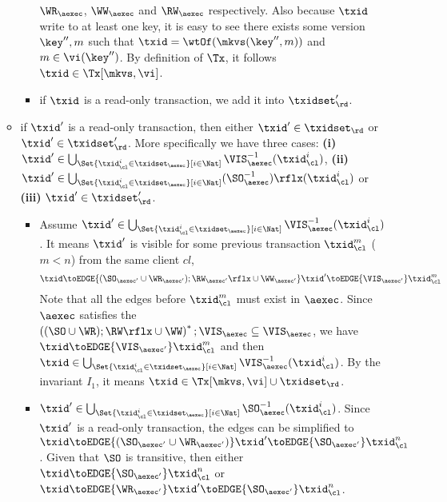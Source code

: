 \begin{itemize}
\begin{itemize}
\begin{itemize}
        \( \WR_\aexec \), \( \WW_\aexec \) and \( \RW_\aexec \) respectively.
        Also because \( \txid \) write to at least one key,
        it is easy to see there exists some version \( \key'',m\) such that 
        \( \txid = \wtOf(\mkvs(\key'',m))\) and \( m \in \vi(\key'')\).
        By definition of \( \Tx \), it follows \( \txid \in \Tx[\mkvs, \vi] \).
        \item if \( \txid \) is a read-only transaction, we add it into \( \txidset'_\rd \).
    \end{itemize}
    \item 
    if \( \txid' \) is a read-only transaction, then either \( \txid' \in \txidset_\rd \) or \( \txid' \in \txidset'_\rd \).
    More specifically we have three cases: \textbf{(i)} \( \txid' \in \bigcup_{\Set{\txid_{\cl}^{i} \in \txidset_{\aexec} }[ i \in \Nat ]} \VIS_{\aexec}^{-1}(\txid^i_\cl) \), \textbf{(ii)} \( \txid' \in \bigcup_{\Set{\txid_{\cl}^{i} \in \txidset_{\aexec} }[ i \in \Nat ]} (\SO_{\aexec}^{-1})\rflx(\txid^i_\cl) \) or \textbf{(iii)} \( \txid' \in \txidset'_\rd\).
    \begin{itemize}
        \item
            Assume \( \txid' \in \bigcup_{\Set{\txid_{\cl}^{i} \in \txidset_{\aexec} }[ i \in \Nat ]} \VIS_{\aexec}^{-1}(\txid^i_\cl) \).
        It means \( \txid' \) is visible for some previous transaction \( \txid_\cl^m \) (\( m < n \)) from the same client \( cl \), 
        \ie 
        \[ 
            \txid \toEDGE{(\SO_{\aexec'} \cup \WR_{\aexec'} ) ; \RW_{\aexec'}\rflx \cup \WW_{\aexec'}} \txid' \toEDGE{\VIS_{\aexec'}}  \txid_\cl^m 
        \]
        Note that all the edges before \( \txid_\cl^m \) must exist in \( \aexec \).
        Since \( \aexec \) satisfies the \( \left( (\SO \cup \WR ) ; \RW\rflx \cup \WW \right)^* ; \VIS_\aexec \subseteq \VIS_\aexec \),
        we have \( \txid \toEDGE{\VIS_{\aexec'}} \txid_\cl^m \) and then \( \txid \in \bigcup_{\Set{\txid_{\cl}^{i} \in \txidset_{\aexec} }[ i \in \Nat ]} \VIS_{\aexec}^{-1}(\txid^i_\cl)\).
        By the invariant \( I_1 \), it means \( \txid \in \Tx[\mkvs, \vi] \cup \txidset_\rd \).
    \item \( \txid' \in \bigcup_{\Set{\txid_{\cl}^{i} \in \txidset_{\aexec} }[ i \in \Nat ]} \SO_{\aexec}^{-1}(\txid^i_\cl) \).
    Since \( \txid' \) is a read-only transaction, 
    the edges can be simplified to \( \txid \toEDGE{(\SO_{\aexec'} \cup \WR_{\aexec'} )} \txid' \toEDGE{\SO_{\aexec'}}  \txid_\cl^n \).
    Given that \( \SO \) is transitive, then  either \( \txid \toEDGE{\SO_{\aexec'}} \txid_\cl^n \) or \( \txid \toEDGE{\WR_{\aexec'} } \txid' \toEDGE{\SO_{\aexec'}}  \txid_\cl^n \).

\end{itemize}
\end{itemize}
\end{itemize}
